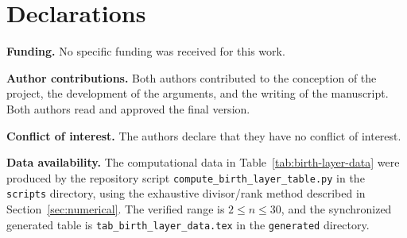 \documentclass[11pt,letterpaper]{article}
\numberwithin{equation}{section}
\theoremstyle{plain}
\theoremstyle{definition}
\theoremstyle{remark}
\begin{document}
\section*{Declarations}

\noindent\textbf{Funding.} No specific funding was received for this work.

\smallskip
\noindent\textbf{Author contributions.} Both authors contributed to the
conception of the project, the development of the arguments, and the writing
of the manuscript. Both authors read and approved the final version.

\smallskip
\noindent\textbf{Conflict of interest.} The authors declare that they have no
conflict of interest.

\smallskip
\noindent\textbf{Data availability.} The computational data in
Table~\ref{tab:birth-layer-data} were produced by the repository script
\texttt{compute\_birth\_layer\_table.py} in the \texttt{scripts} directory,
using the exhaustive divisor/rank method described in
Section~\ref{sec:numerical}. The verified range is $2\le n\le30$, and the
synchronized generated table is \texttt{tab\_birth\_layer\_data.tex} in the
\texttt{generated} directory.



\end{document}

